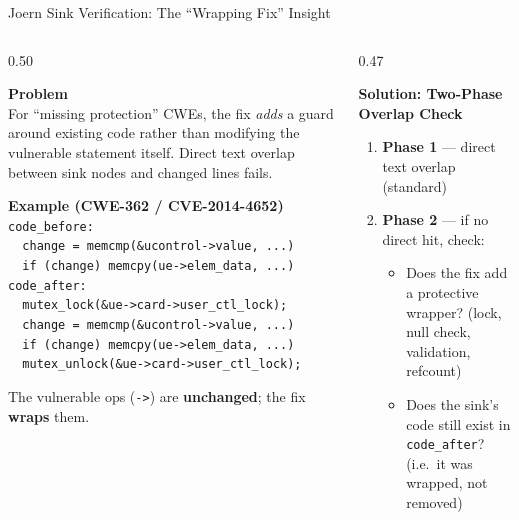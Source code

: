 \documentclass[aspectratio=169,10pt]{beamer}
\begin{document}
\begin{frame}{Joern Sink Verification: The ``Wrapping Fix'' Insight}
\begin{columns}[T]
\begin{column}{0.50\textwidth}

  \textbf{Problem}\\[3pt]
  {\small For ``missing protection'' CWEs, the fix \emph{adds} a guard around
  existing code rather than modifying the vulnerable statement itself.
  Direct text overlap between sink nodes and changed lines fails.}

  \vspace{0.5em}
  \textbf{Example (CWE-362 / CVE-2014-4652)}\\[3pt]
  {\scriptsize
  \texttt{code\_before:}\\
  \texttt{\ \ change = memcmp(\&ucontrol->value, ...)}\\
  \texttt{\ \ if (change) memcpy(ue->elem\_data, ...)}\\[4pt]
  \texttt{code\_after:}\\
  \texttt{\ \ \textcolor{hit}{mutex\_lock(\&ue->card->user\_ctl\_lock);}}\\
  \texttt{\ \ change = memcmp(\&ucontrol->value, ...)}\\
  \texttt{\ \ if (change) memcpy(ue->elem\_data, ...)}\\
  \texttt{\ \ \textcolor{hit}{mutex\_unlock(\&ue->card->user\_ctl\_lock);}}
  }

  \vspace{0.3em}
  {\scriptsize The vulnerable ops (\texttt{->}) are \textbf{unchanged};
  the fix \textbf{wraps} them.}

\end{column}
\begin{column}{0.47\textwidth}

  \textbf{Solution: Two-Phase Overlap Check}\\[4pt]
  {\scriptsize
  \begin{enumerate}\itemsep4pt
    \item \textbf{Phase 1} — direct text overlap (standard)
    \item \textbf{Phase 2} — if no direct hit, check:
      \begin{itemize}\itemsep2pt
        \item[\textcolor{c1}{\faIcon{lock}}] Does the fix add a protective wrapper?
              (lock, null check, validation, refcount)
        \item[\textcolor{c3}{\faIcon{search}}] Does the sink's code still exist
              in \texttt{code\_after}? (i.e.\ it was wrapped, not removed)
      \end{itemize}
  \end{enumerate}}


\end{column}
\end{columns}
\end{frame}
\end{document}
